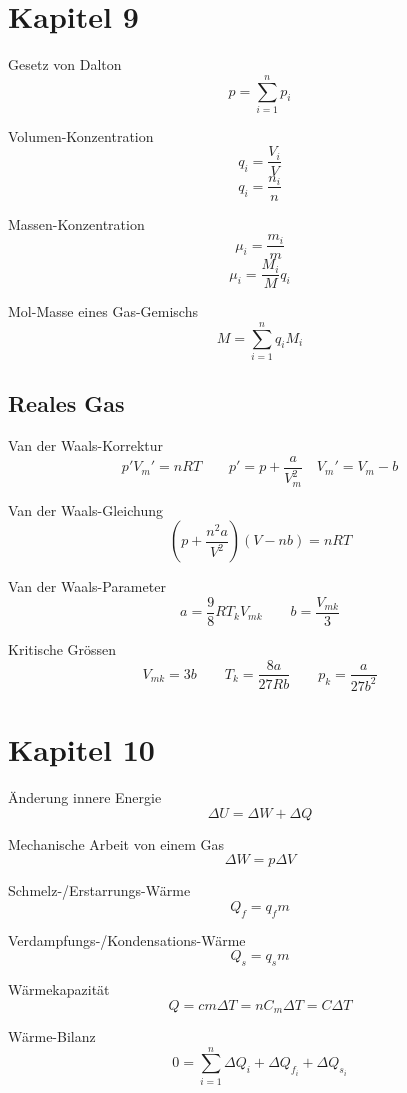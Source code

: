 \documentclass[a4paper, twocolumn]{article}
\numberwithin{equation}{section}
\theoremstyle{hsr-def}
\theoremstyle{hsr-sub}
\begin{document}
\section*{Kapitel 9}
Gesetz von Dalton
\[
    p = \sum_{i = 1}^n p_i
\]

Volumen-Konzentration
\[
    q_i = \frac{V_i}{V}
\]
\[
    q_i = \frac{n_i}{n}
\]

Massen-Konzentration
\[
    \mu_i = \frac{m_i}{m}
\]
\[
    \mu_i = \frac{M_i}{M} q_i
\]

Mol-Masse eines Gas-Gemischs
\[
    M = \sum_{i = 1}^n q_i M_i
\]

\subsection*{Reales Gas}
Van der Waals-Korrektur
\[
    p'V_m' = nRT
    \qquad
    p' = p + \frac{a}{V_m^2}
    \quad
    V_m' = V_m - b
\]

\begin{figure}[h] \centering
    
\end{figure}

Van der Waals-Gleichung
\[
    \left(p + \frac{n^2 a}{V^2} \right)(V - nb) = nRT
\]

Van der Waals-Parameter
\[
    a = \frac{9}{8} R T_k V_{mk}
    \qquad
    b = \frac{V_{mk}}{3}
\]

Kritische Gr\"ossen
\[
    V_{mk} = 3b
    \qquad
    T_k = \frac{8a}{27Rb}
    \qquad
    p_k = \frac{a}{27b^2}
\]

\section*{Kapitel 10}
\"Anderung innere Energie
\[
    \Delta U = \Delta W + \Delta Q
\]

Mechanische Arbeit von einem Gas
\[
    \Delta W = p \Delta V
\]

Schmelz-/Erstarrungs-W\"arme
\[
    Q_f = q_f m
\]

Verdampfungs-/Kondensations-W\"arme
\[
    Q_s = q_s m
\]

W\"armekapazit\"at
\[
    Q = cm\Delta T = n C_m \Delta T = C \Delta T
\]

W\"arme-Bilanz
\[
    0 = \sum_{i = 1}^n \Delta Q_i + \Delta Q_{f_i} + \Delta Q_{s_i}
\]
\end{document}
